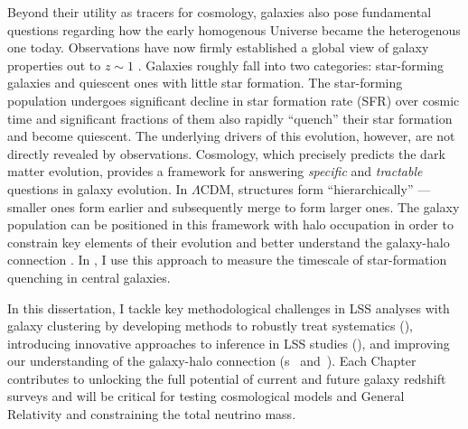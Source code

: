 Beyond their utility as tracers for cosmology, galaxies also pose fundamental 
questions regarding how the early homogenous Universe became the heterogenous 
one today. Observations have now firmly established a global view of galaxy 
properties out to $z\sim1$ \citep[\emph{e.g.}][]{Blanton:2009aa, Moustakas:2013aa}.
Galaxies roughly fall into two categories: star-forming galaxies and 
quiescent ones with little star formation. The star-forming population 
undergoes significant decline in star formation rate (SFR) over cosmic 
time and significant fractions of them also rapidly ``quench'' their 
star formation and become quiescent. The underlying drivers of this 
evolution, however, are not directly revealed by observations.
Cosmology, which precisely predicts the dark matter evolution, provides 
a framework for answering {\em specific} and {\em tractable} questions 
in galaxy evolution.  In $\Lambda$CDM, structures form 
``hierarchically'' --- smaller ones form earlier and subsequently 
merge to form larger ones. The galaxy population can be positioned in 
this framework with halo occupation in order to constrain key elements 
of their evolution and better understand the galaxy-halo connection 
\citep[][]{Wetzel:2013aa, Wetzel:2014aa, Tinker:2016ab, Tinker:2017aa}. 
In , I use this approach to measure the timescale of star-formation quenching 
in central galaxies. 

In this dissertation, I tackle key methodological challenges in LSS analyses
with galaxy clustering by developing methods to robustly treat systematics (), 
introducing innovative approaches to inference in LSS studies (), and 
improving our understanding of the galaxy-halo connection 
(\chapname s~ and~). Each Chapter contributes to unlocking 
the full potential of current and future galaxy redshift surveys and will be
critical for testing cosmological models and General Relativity and 
constraining the total neutrino mass. 

